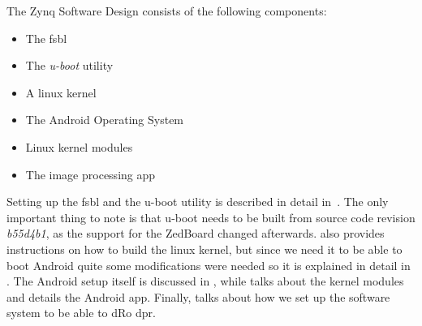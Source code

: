 The Zynq Software Design consists of the following components:
\begin{itemize}
	\item The \gls{fsbl}
	\item The \emph{u-boot} utility
	\item A linux kernel
	\item The Android Operating System
	\item Linux kernel modules
	\item The image processing app
\end{itemize}
Setting up the \gls{fsbl} and the u-boot utility is described in detail
in~\cite{DigilentTutorial}.
The only important thing to note is that u-boot needs to be built from source
code revision \emph{b55d4b1}, as the support for the ZedBoard changed
afterwards.
\cite{DigilentTutorial} also provides instructions on how to build the linux
kernel, but since we need it to be able to boot Android quite some modifications
were needed so it is explained in detail in .
The Android setup itself is discussed in , while
 talks about the kernel modules and
 details the Android app.
Finally,  talks about how we set up
the software system to be able to dRo \gls{dpr}.
